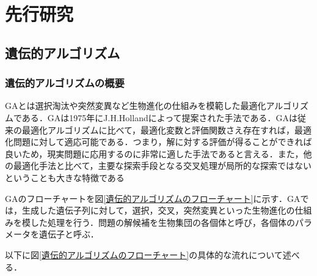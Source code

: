 \chapter{先行研究}
\thispagestyle{fancy} %
\lhead{}
\chead{}
\rhead{}
\lfoot{} 
\cfoot{\thepage}  
\rfoot{}
%

\section{遺伝的アルゴリズム}
\label{sec2.1}

\subsection{遺伝的アルゴリズムの概要}
\label{sec2.1.1}

GAとは選択淘汰や突然変異など生物進化の仕組みを模範した最適化アルゴリズムである\cite{GA}．GAは1975年にJ.H.Hollandによって提案された手法である．GAは従来の最適化アルゴリズムに比べて，最適化変数と評価関数さえ存在すれば，最適化問題に対して適応可能である．つまり，解に対する評価が得ることができれば良いため，現実問題に応用するのに非常に適した手法であると言える．また，他の最適化手法と比べて，主要な探索手段となる交叉処理が局所的な探索ではないということも大きな特徴である

GAのフローチャートを図\ref{遺伝的アルゴリズムのフローチャート}に示す．GAでは，生成した遺伝子列に対して，選択，交叉，突然変異といった生物進化の仕組みを模した処理を行う．問題の解候補を生物集団の各個体と呼び，各個体のパラメータを遺伝子と呼ぶ．

以下に図\ref{遺伝的アルゴリズムのフローチャート}の具体的な流れについて述べる．


